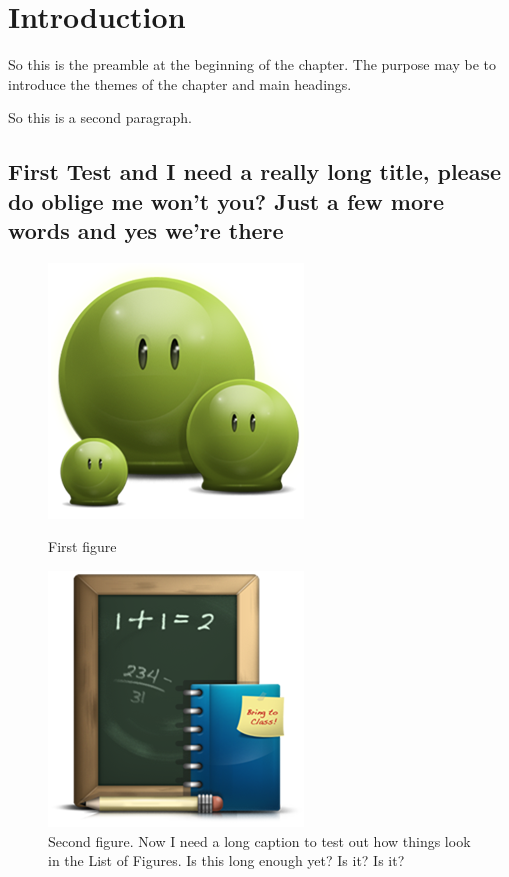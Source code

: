 
\chapter{Introduction}

So this is the preamble at the beginning of the chapter. The purpose may be to introduce the themes of the chapter and main headings.

So this is a second paragraph.

\section{First Test and I need a really long title, please do oblige me won't you? Just a few more words and yes we're there}
\lipsum[1-2]

\begin{figure}[hbt!]\centering
\includegraphics[width=.3\textwidth]{green}
\caption[First figure]{First figure\\}

\bigskip

\includegraphics[width=.3\textwidth]{school}
\caption{Second figure. Now I need a long caption to test out how things look in the List of Figures. Is this long enough yet? Is it? Is it?}
\end{figure}

\lipsum[4-5]


